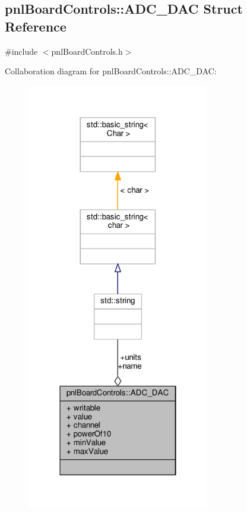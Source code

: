 \subsection{pnl\+Board\+Controls\+:\+:A\+D\+C\+\_\+\+D\+AC Struct Reference}
\label{structpnlBoardControls_1_1ADC__DAC}


{\ttfamily \#include $<$pnl\+Board\+Controls.\+h$>$}



Collaboration diagram for pnl\+Board\+Controls\+:\+:A\+D\+C\+\_\+\+D\+AC\+:
\nopagebreak
\begin{figure}[H]
\begin{center}
\leavevmode
\includegraphics[width=226pt]{d8/d67/structpnlBoardControls_1_1ADC__DAC__coll__graph}
\end{center}
\end{figure}
